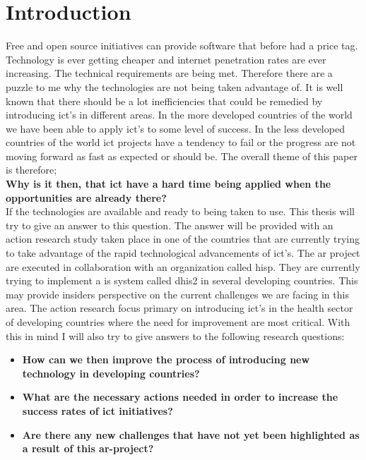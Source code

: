 \chapter{Introduction}

Free and open source initiatives can provide software that before had a price tag.
Technology is ever getting cheaper and internet penetration rates are ever increasing.
The technical requirements are being met. 
Therefore there are a puzzle to me why the technologies are not being taken advantage of.
It is well known that there should be a lot inefficiencies that could be remedied by introducing \gls{ict}'s in different areas.
In the more developed countries of the world we have been able to apply \gls{ict}'s to some level of success.
In the less developed countries of the world \gls{ict} projects have a tendency to fail or the progress are not moving forward as fast as expected or should be.
The overall theme of this paper is therefore;\vspace{1cm}\\
\textbf{Why is it then, that \gls{ict} have a hard time being applied when the opportunities are already there?}\vspace{1cm}\\
If the technologies are available and ready to being taken to use. 
This thesis will try to give an answer to this question. 
\newpage
The answer will be provided with an action research study taken place in one of the countries that are currently trying to take advantage of the rapid technological advancements of \gls{ict}'s.
The \gls{ar} project are executed in collaboration with an organization called \gls{hisp}.
They are currently trying to implement a \gls{is} system called \gls{dhis2} in several developing countries.
This may provide insiders perspective on the current challenges we are facing in this area. 
The action research focus primary on introducing \gls{ict}'s in the health sector of developing countries where the need for improvement are most critical. 
With this in mind I will also try to give answers to the following research questions:
\begin{itemize}
\item \textbf{How can we then improve the process of introducing new technology in developing countries?}
\item \textbf{What are the necessary actions needed in order to increase the success rates of \gls{ict} initiatives?}
\item \textbf{Are there any new challenges that have not yet been highlighted as a result of this \gls{ar}-project?}
\end{itemize}
